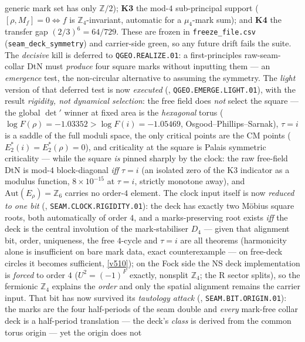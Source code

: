 \documentclass[11pt,a4paper]{article}
\newcommand{\Z}{\mathbb Z}
\begin{document}
\begin{keybox}
generic mark set has only $\Z/2$); \textbf{K3} the mod-$4$ sub-principal support ($[\rho,M_f]{=}0\Leftrightarrow
f$ is $\Z_4$-invariant, automatic for a $\mu_4$-mark sum); and \textbf{K4} the transfer gap $(2/3)^6{=}64/729$.
These are frozen in \texttt{freeze\_file.csv} (\texttt{seam\_deck\_symmetry}) and carrier-side green, so any
future drift fails the suite. The \emph{decisive} kill is deferred to \texttt{QGEO.REALIZE.01}: a
first-principles raw-seam-collar DtN must \emph{produce} four square marks without inputting them --- an
\emph{emergence} test, the non-circular alternative to assuming the symmetry. The \emph{light} version of
that deferred test is now \emph{executed} (,
\texttt{QGEO.EMERGE.LIGHT.01}), with the result \emph{rigidity, not dynamical selection}: the free field
does \emph{not} select the square --- the global $\det{}'$ winner at fixed area is the \emph{hexagonal}
torus ($\log F(\rho)=-1.03352>\log F(i)=-1.05469$, Osgood--Phillips--Sarnak), $\tau=i$ is a saddle of the
full moduli space, the only critical points are the CM points ($E_2^*(i)=E_2^*(\rho)=0$), and criticality
at the square is Palais symmetric criticality --- while the square \emph{is} pinned sharply by the clock:
the raw free-field DtN is mod-$4$ block-diagonal \emph{iff} $\tau=i$ (an isolated zero of the K3
indicator as a modulus function, $8\times10^{-15}$ at $\tau=i$, strictly monotone away), and
$\mathrm{Aut}(E_\rho)=\Z_6$ carries no order-$4$ element. The clock input itself is now
\emph{reduced to one bit} (, \texttt{SEAM.CLOCK.RIGIDITY.01}):
the deck has exactly two M\"obius square roots, both automatically of order $4$, and a
marks-preserving root exists \emph{iff} the deck is the central involution of the mark-stabiliser
$D_4$ --- given that alignment bit, order, uniqueness, the free $4$-cycle and $\tau=i$ are all
theorems (harmonicity alone is insufficient on bare mark data, exact counterexample --- on free-deck
circles it becomes sufficient, \vref{v510}); on the Fock side the NS deck
implementation is \emph{forced} to order $4$ ($U^2=(-1)^F$ exactly, nonsplit $\Z_4$; the R sector
splits), so the fermionic $\Z_4$ explains the \emph{order} and only the spatial alignment remains
the carrier input. That bit has now survived its \emph{tautology attack}
(, \texttt{SEAM.BIT.ORIGIN.01}): the marks are the four
half-periods of the seam double and \emph{every} mark-free collar deck is a half-period translation
--- the deck's \emph{class} is derived from the common torus origin --- yet the origin does not

\end{keybox}
\end{document}

